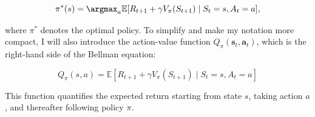 \begin{equation}
    \pi^*(s) = \argmax_{a} \mathbb{E} [R_{t+1} + \gamma V_\pi(S_{t+1}) \mid S_t = s, A_t = a],
\end{equation}

where \(\pi^*\) denotes the optimal policy. To simplify and make my notation more compact, I will also introduce the action-value function \(Q_\pi(\bm{s}_t, \bm{a}_t)\), which is the right-hand side of the Bellman equation:

\begin{equation}
    Q_\pi(s, a) = \mathbb{E} [R_{t+1} + \gamma V_\pi(S_{t+1}) \mid S_t = s, A_t = a]
\end{equation}

This function quantifies the expected return starting from state \(s\), taking action \(a\), and thereafter following policy \(\pi\). 